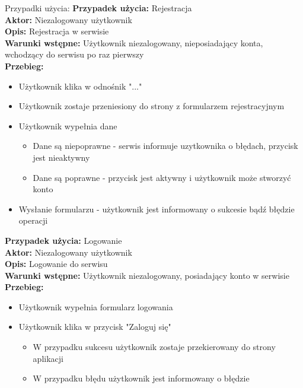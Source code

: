 Przypadki użycia:
\newline
\textbf{Przypadek użycia:} Rejestracja \\
\textbf{Aktor:} Niezalogowany użytkownik \\
\textbf{Opis:} Rejestracja w serwisie\\
\textbf{Warunki wstępne:} Użytkownik niezalogowany, nieposiadający konta, wchodzący do serwisu po raz pierwszy\\
\textbf{Przebieg:}
\begin{itemize}
    \item Użytkownik klika w odnośnik "..."
    \item Użytkownik zostaje przeniesiony do strony z formularzem rejestracyjnym
    \item  Użytkownik wypełnia dane
    \begin{itemize}
        \item Dane są niepoprawne - serwis informuje uzytkownika o błędach, przycisk jest nieaktywny
        \item Dane są poprawne - przycisk jest aktywny i użytkownik może stworzyć konto
    \end{itemize}
    \item Wysłanie formularzu - użytkownik jest informowany o sukcesie bądź błędzie operacji
\end{itemize}

\textbf{Przypadek użycia:} Logowanie\\
\textbf{Aktor:} Niezalogowany użytkownik\\
\textbf{Opis:} Logowanie do serwisu\\
\textbf{Warunki wstępne:} Użytkownik niezalogowany, posiadający konto w serwisie\\
\textbf{Przebieg:}
\begin{itemize}
    \item Użytkownik wypełnia formularz logowania
    \item Użytkownik klika w przycisk "Zaloguj się"
    \begin{itemize}
        \item W przypadku sukcesu użytkownik zostaje przekierowany do strony aplikacji
        \item W przypadku błędu użytkownik jest informowany o błędzie
    \end{itemize}
\end{itemize}

